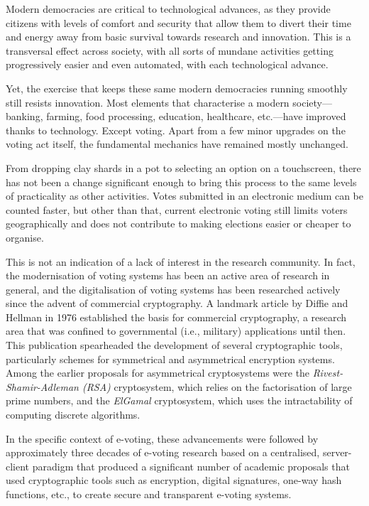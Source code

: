 \documentclass[../main.tex]{subfiles}
\begin{document}
Modern democracies are critical to technological advances, as they provide citizens with levels of comfort and security that allow them to divert their time and energy away from basic survival towards research and innovation. This is a transversal effect across society, with all sorts of mundane activities getting progressively easier and even automated, with each technological advance.
\par
Yet, the exercise that keeps these same modern democracies running smoothly still resists innovation. Most elements that characterise a modern society—banking, farming, food processing, education, healthcare, etc.—have improved thanks to technology. Except voting. Apart from a few minor upgrades on the voting act itself, the fundamental mechanics have remained mostly unchanged.
\par
From dropping clay shards in a pot to selecting an option on a touchscreen, there has not been a change significant enough to bring this process to the same levels of practicality as other activities. Votes submitted in an electronic medium can be counted faster, but other than that, current electronic voting still limits voters geographically and does not contribute to making elections easier or cheaper to organise.
\par
This is not an indication of a lack of interest in the research community. In fact, the modernisation of voting systems has been an active area of research in general, and the digitalisation of voting systems has been researched actively since the advent of commercial cryptography. A landmark article by Diffie and Hellman in 1976 \cite{Diffie1976} established the basis for commercial cryptography, a research area that was confined to governmental (i.e., military) applications until then. This publication spearheaded the development of several cryptographic tools, particularly schemes for symmetrical and asymmetrical encryption systems. Among the earlier proposals for asymmetrical cryptosystems were the \textit{Rivest-Shamir-Adleman (RSA)} \cite{Rivest1983} cryptosystem, which relies on the factorisation of large prime numbers, and the \textit{ElGamal} \cite{ElGamal1984} cryptosystem, which uses the intractability of computing discrete algorithms.
\par
In the specific context of e-voting, these advancements were followed by approximately three decades of e-voting research based on a centralised, server-client paradigm that produced a significant number of academic proposals that used cryptographic tools such as encryption, digital signatures, one-way hash functions, etc., to create secure and transparent e-voting systems.
\end{document}
